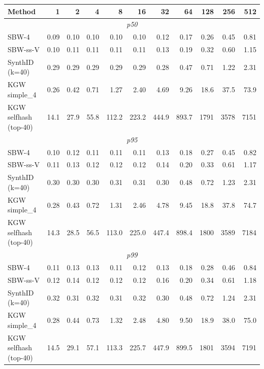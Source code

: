 \begin{tabular}{@{}l|rrrrrrrrrr@{}}
\toprule
Method & 1 & 2 & 4 & 8 & 16 & 32 & 64 & 128 & 256 & 512 \\
\midrule
\multicolumn{11}{c}{\textit{p50}} \\
\midrule
SBW-4 & 0.09 & 0.10 & 0.10 & 0.10 & 0.10 & 0.12 & 0.17 & 0.26 & 0.45 & 0.81 \\
SBW-ss-V & 0.10 & 0.11 & 0.11 & 0.11 & 0.11 & 0.13 & 0.19 & 0.32 & 0.60 & 1.15 \\
SynthID (k=40) & 0.29 & 0.29 & 0.29 & 0.29 & 0.29 & 0.28 & 0.47 & 0.71 & 1.22 & 2.31 \\
KGW simple\_4 & 0.26 & 0.42 & 0.71 & 1.27 & 2.40 & 4.69 & 9.26 & 18.6 & 37.5 & 73.9 \\
KGW selfhash (top-40) & 14.1 & 27.9 & 55.8 & 112.2 & 223.2 & 444.9 & 893.7 & 1791 & 3578 & 7151 \\
\midrule
\multicolumn{11}{c}{\textit{p95}} \\
\midrule
SBW-4 & 0.10 & 0.12 & 0.11 & 0.11 & 0.11 & 0.13 & 0.18 & 0.27 & 0.45 & 0.82 \\
SBW-ss-V & 0.11 & 0.13 & 0.12 & 0.12 & 0.12 & 0.14 & 0.20 & 0.33 & 0.61 & 1.17 \\
SynthID (k=40) & 0.30 & 0.30 & 0.30 & 0.31 & 0.31 & 0.30 & 0.48 & 0.72 & 1.23 & 2.31 \\
KGW simple\_4 & 0.28 & 0.43 & 0.72 & 1.31 & 2.46 & 4.78 & 9.45 & 18.8 & 37.8 & 74.7 \\
KGW selfhash (top-40) & 14.3 & 28.5 & 56.5 & 113.0 & 225.0 & 447.4 & 898.4 & 1800 & 3589 & 7184 \\
\midrule
\multicolumn{11}{c}{\textit{p99}} \\
\midrule
SBW-4 & 0.11 & 0.13 & 0.13 & 0.11 & 0.12 & 0.13 & 0.18 & 0.28 & 0.46 & 0.84 \\
SBW-ss-V & 0.12 & 0.14 & 0.12 & 0.12 & 0.12 & 0.16 & 0.20 & 0.34 & 0.61 & 1.18 \\
SynthID (k=40) & 0.32 & 0.31 & 0.32 & 0.31 & 0.32 & 0.30 & 0.48 & 0.72 & 1.24 & 2.31 \\
KGW simple\_4 & 0.28 & 0.44 & 0.73 & 1.32 & 2.48 & 4.80 & 9.50 & 18.9 & 38.0 & 75.0 \\
KGW selfhash (top-40) & 14.5 & 29.1 & 57.1 & 113.3 & 225.7 & 447.9 & 899.5 & 1801 & 3594 & 7191 \\
\bottomrule
\end{tabular}
